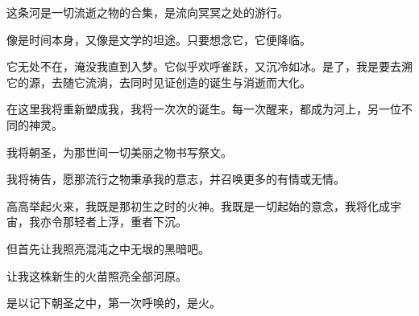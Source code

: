 \documentclass[UTF8]{article}
\begin{document}
\par 这条河是一切流逝之物的合集，是流向冥冥之处的游行。
\par 像是时间本身，又像是文学的坦途。只要想念它，它便降临。
\par 它无处不在，淹没我直到入梦。它似乎欢呼雀跃，又沉冷如冰。是了，我是要去溯它的源，去随它流淌，去同时见证创造的诞生与消逝而大化。
\par 在这里我将重新塑成我，我将一次次的诞生。每一次醒来，都成为河上，另一位不同的神灵。
\par 我将朝圣，为那世间一切美丽之物书写祭文。
\par 我将祷告，愿那流行之物秉承我的意志，并召唤更多的有情或无情。
\par 高高举起火来，我既是那初生之时的火神。我既是一切起始的意念，我将化成宇宙，我亦令那轻者上浮，重者下沉。
\par 但首先让我照亮混沌之中无垠的黑暗吧。
\par 让我这株新生的火苗照亮全部河原。
\par 是以记下朝圣之中，第一次呼唤的，是火。
\end{document}
